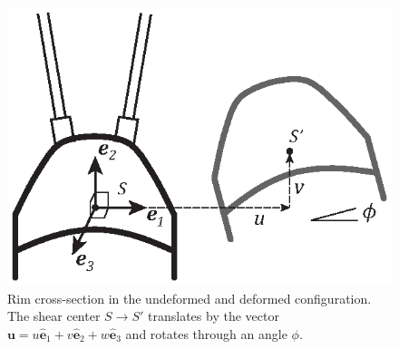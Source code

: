 \documentclass{bmd2016p}
\newcommand{\e}{\ensuremath{\hat{\bm{e}}_1}}
\newcommand{\ee}{\ensuremath{\hat{\bm{e}}_2}}
\newcommand{\eee}{\ensuremath{\hat{\bm{e}}_3}}
\begin{document}
\begin{figure}[!ht]
\centering
\includegraphics[scale=1.0]{figures/bmd_figures-06.eps}
\caption{Rim cross-section in the undeformed and deformed configuration. The shear center $S\rightarrow S'$ translates by the vector $\bm{u} = u\e + v\ee + w\eee$ and rotates through an angle $\phi$.}
\label{fig:def}
\end{figure}
\end{document}
